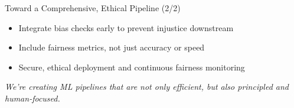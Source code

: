 \documentclass[aspectratio=169]{beamer}
\begin{document}
%
%
%
\begin{frame}{Toward a Comprehensive, Ethical Pipeline (2/2)}
\begin{itemize}
\item Integrate bias checks early to prevent injustice downstream
\item Include fairness metrics, not just accuracy or speed
\item Secure, ethical deployment and continuous fairness monitoring
\end{itemize}

\vspace{0.8em}
\emph{We’re creating ML pipelines that are not only efficient, but also principled and human-focused.}
\end{frame}
\end{document}
